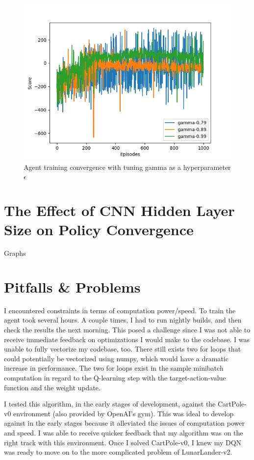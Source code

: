 \documentclass[conference]{IEEEtran}
\begin{document}
\begin{figure}[]
    \centering
    \includegraphics[scale=0.45]{figs/hyperparameter-test-gamma}
    \caption{Agent training convergence with tuning gamma as a hyperparameter $\epsilon$}
    \label{fig:hyperparameter-test-gamma}
\end{figure}


\section{The Effect of CNN Hidden Layer Size on Policy Convergence}
Graphs

\section{Pitfalls \& Problems}
I encountered constraints in terms of computation power/speed. To train the agent took several hours. A couple times, I had to run nightly builds, and then check the results the next morning. This posed a challenge since I was not able to receive immediate feedback on optimizations I would make to the codebase. I was unable to fully vectorize my codebase, too. There still exists two for loops that could potentially be vectorized using numpy, which would have a dramatic increase in performance. The two for loops exist in the sample minibatch computation in regard to the Q-learning step with the target-action-value function and the weight update.

I tested this algorithm, in the early stages of development, against the CartPole-v0 environment (also provided by OpenAI's gym). This was ideal to develop against in the early stages because it alleviated the issues of computation power and speed. I was able to receive quicker feedback that my algorithm was on the right track with this environment. Once I solved CartPole-v0, I knew my DQN was ready to move on to the more complicated problem of LunarLander-v2.
\end{document}
